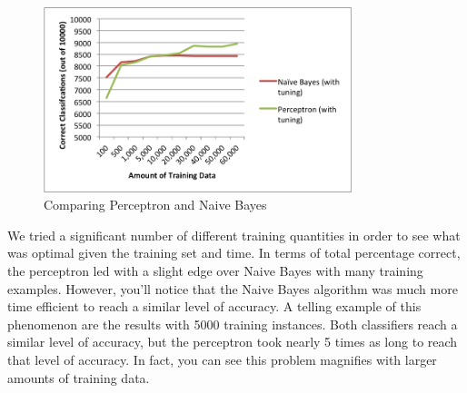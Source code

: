 \documentclass{article}
\theoremstyle{remark}
\begin{document}
     \begin{figure}[h!]
    \centering
    \includegraphics[width=0.8\textwidth]{../graphs/pvsnb.png}
    \caption{Comparing Perceptron and Naive Bayes}
    \label{fig:awesome_image}
    \end{figure}

     We tried a significant number of different training quantities in order to see what was optimal given the training set and time. In terms of total percentage correct, the perceptron led with a slight edge over Naive Bayes with many training examples. However, you'll notice that the Naive Bayes algorithm was much more time efficient to reach a similar level of accuracy. A telling example of this phenomenon are the results with 5000 training instances. Both classifiers reach a similar level of accuracy, but the perceptron took nearly 5 times as long to reach that level of accuracy. In fact, you can see this problem magnifies with larger amounts of training data.
\end{document}
